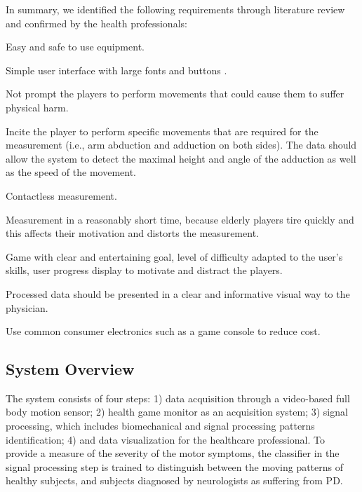 \documentclass[10pt, conference, compsocconf]{IEEEtran}
\begin{document}

In summary, we identified the following requirements through literature review and confirmed by the health professionals: 

\begin{compactenum}
    \item Easy and safe to use equipment.
    \item Simple user interface with large fonts and buttons \cite{Uzor:2014:ILU:2611247.2557160}.
    \item Not prompt the players to perform movements that could cause them to suffer physical harm.
    \item Incite the player to perform specific movements that are required for the measurement (i.e., arm abduction and adduction on both sides). The data should allow the system to detect the maximal height and angle of the adduction as well as the speed of the movement.
    \item Contactless measurement.
    \item Measurement in a reasonably short time, because elderly players tire quickly and this affects their motivation and distorts the measurement.
    \item Game with clear and entertaining goal, level of difficulty adapted to the user's skills, user progress display to motivate and distract the players\cite{Uzor:2014:ILU:2611247.2557160}.
    \item Processed data should be presented in a clear and informative visual way to the physician.
    \item Use common consumer electronics such as a game console to reduce cost.
\end{compactenum}

\subsection{System Overview}

The system consists of four steps: 1) data acquisition through a video-based full body motion sensor; 2) health game monitor as an acquisition system; 3) signal processing, which includes biomechanical and signal processing patterns identification; 4) and data visualization for the healthcare professional. To provide a measure of the severity of the motor symptoms, the classifier in the signal processing step is trained to distinguish between the moving patterns of healthy subjects, and subjects diagnosed by neurologists as suffering from PD.
\end{document}
